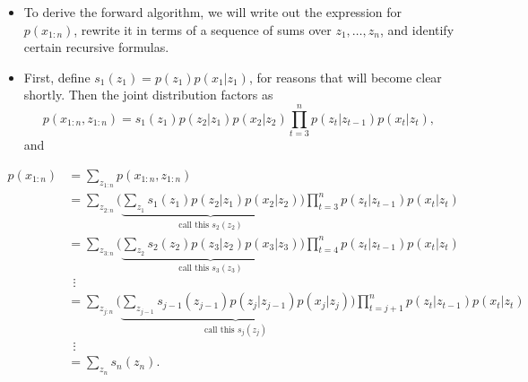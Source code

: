 \documentclass[12pt]{article}
\begin{document}
\begin{itemize}
\item To derive the forward algorithm, we will write out the expression for $p(x_{1:n})$, rewrite it in terms of a sequence of sums over $z_1,\ldots,z_n$, and identify certain recursive formulas.
\item First, define $s_1(z_1) = p(z_1) p(x_1 | z_1)$, for reasons that will become clear shortly. 
Then the joint distribution factors as
$$ p(x_{1:n},z_{1:n}) = s_1(z_1) p(z_2 | z_1) p(x_2 | z_2) \prod_{t = 3}^n p(z_t | z_{t -1}) p(x_t | z_t), $$
and
\end{itemize}
\begin{align*}
p(x_{1:n}) & = \sum_{z_{1:n}} p(x_{1:n},z_{1:n})\\
& = \sum_{z_{2:n}} \Big(\underbrace{\sum_{z_1} s_1(z_1) p(z_2 | z_1) p(x_2 | z_2)}_{\textstyle \text{call this } s_2(z_2)}\Big) \prod_{t = 3}^n p(z_t | z_{t -1}) p(x_t | z_t)\\
& = \sum_{z_{3:n}} \Big(\underbrace{\sum_{z_2} s_2(z_2) p(z_3 | z_2) p(x_3 | z_3)}_{\textstyle \text{call this } s_3(z_3)}\Big) \prod_{t = 4}^n p(z_t | z_{t -1}) p(x_t | z_t)\\
&~~\vdots\\
& = \sum_{z_{j:n}} \Big(\underbrace{\sum_{z_{j-1}} s_{j-1}(z_{j-1}) p(z_j | z_{j-1}) p(x_j | z_j)}_{\textstyle \text{call this } s_j(z_j)}\Big) \prod_{t = j+1}^n p(z_t | z_{t -1}) p(x_t | z_t)\\
&~~\vdots\\
& = \sum_{z_n} s_n(z_n).
\end{align*}
\end{document}
